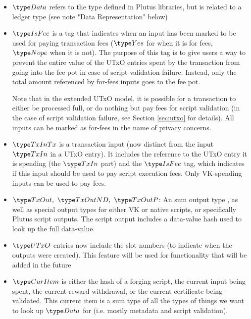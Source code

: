 \begin{itemize}
  \item $\Data$ refers to the type defined in Plutus libraries, but is
  related to a ledger type (see note "Data Representation" below)

  \item $\IsFee$ is a tag that indicates when an input has been marked
  to be used for paying transaction fees ($\Yes$ for when it is for fees,
  $\Nope$ when it is not). The purpose of this tag is to give users a way to prevent
  the entire value of the UTxO entries spent by the transaction
  from going into the fee pot in case of script validation failure.
  Instead, only the total amount referenced by for-fees inputs goes
  to the fee pot.

  Note that in the extended UTxO model, it is possible for a transaction
  to either be processed full, or do nothing but pay fees for script
  validation (in the case of script validation failure, see Section
  \ref{sec:utxo} for details). All inputs can be marked as for-fees in
  the name of privacy concerns.

  \item $\TxInTx$ is a transaction input (now distinct from the input $\TxIn$ in
  a UTxO entry). It includes the reference to the UTxO entry it is spending
  (the $\TxIn$ part) and the $\IsFee$ tag, which indicates if this input should
  be used to pay script execution fees. Only VK-spending inputs can be used to
  pay fees.

  \item $\TxOut,~\TxOutND,~\TxOutP$: An sum output type ,
  as well as special output types for either VK or native scripts, or
  specifically Plutus script outputs. The script output
  includes a data-value hash used to look up the full data-value.

  \item $\UTxO$ entries now include the slot numbers (to indicate when the
  outputs were created).
  This feature will be used for functionality that will be added in the future


  \item $\CurItem$ is either the hash of a
  forging script, the current input being
  spent, the current reward
  withdrawal, or the current certificate being validated.
  This current item is a sum type of all the types of things we want to
  look up $\Data$ for (i.e. mostly metadata and script validation).

\end{itemize}


